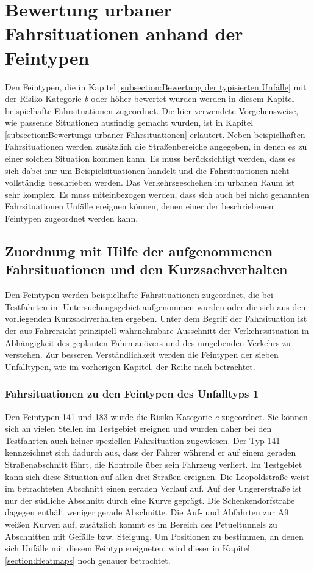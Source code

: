 \section{Bewertung urbaner Fahrsituationen anhand der Feintypen}\label{section:Zuordnung der Unfälle zu Fahrsituationen}
Den Feintypen, die in Kapitel \ref{subsection:Bewertung der typisierten Unfälle} mit der Risiko-Kategorie \textit{b} oder höher bewertet wurden werden in diesem Kapitel beispielhafte Fahrsituationen zugeordnet. Die hier verwendete Vorgehensweise, wie passende Situationen ausfindig gemacht wurden, ist in Kapitel \ref{subsection:Bewertungs urbaner Fahrsituationen} erläutert. Neben beispielhaften Fahrsituationen werden zusätzlich die Straßenbereiche angegeben, in denen es zu einer solchen Situation kommen kann. Es muss berücksichtigt werden, dass es sich dabei nur um Beispielsituationen handelt und die Fahrsituationen nicht vollständig beschrieben werden. Das Verkehrsgeschehen im urbanen Raum  ist sehr komplex. Es muss miteinbezogen werden, dass sich auch bei nicht genannten Fahrsituationen Unfälle ereignen können, denen einer der beschriebenen Feintypen zugeordnet werden kann.

\subsection{Zuordnung mit Hilfe der aufgenommenen Fahrsituationen und den Kurzsachverhalten}\label{subsection:Zuordnung mit den aufgenommenen Fahrsituationen}
Den Feintypen werden beispielhafte Fahrsituationen zugeordnet, die bei Testfahrten im Untersuchungsgebiet aufgenommen wurden oder die sich aus den vorliegenden Kurzsachverhalten ergeben. Unter dem Begriff der Fahrsituation ist der aus Fahrersicht prinzipiell wahrnehmbare Ausschnitt der Verkehrssituation in Abhängigkeit des geplanten Fahrmanövers und des umgebenden Verkehrs zu verstehen. Zur besseren Verständlichkeit werden die Feintypen der sieben Unfalltypen, wie im vorherigen Kapitel, der Reihe nach betrachtet.

\subsubsection{Fahrsituationen zu den Feintypen des Unfalltyps 1}
Den Feintypen 141 und 183 wurde die Risiko-Kategorie \textit{c} zugeordnet. Sie können sich an vielen Stellen im Testgebiet ereignen und wurden daher bei den Testfahrten auch keiner speziellen Fahrsituation zugewiesen. Der Typ 141 kennzeichnet sich dadurch aus, dass der Fahrer während er auf einem geraden Straßenabschnitt fährt, die Kontrolle über sein Fahrzeug verliert. Im Testgebiet kann sich diese Situation auf allen drei Straßen ereignen. Die Leopoldstraße weist im betrachteten Abschnitt einen geraden Verlauf auf. Auf der Ungererstraße ist nur der südliche Abschnitt durch eine Kurve geprägt. Die Schenkendorfstraße dagegen enthält weniger gerade Abschnitte. Die Auf- und Abfahrten zur A9 weißen Kurven auf, zusätzlich kommt es im Bereich des Petueltunnels zu Abschnitten mit Gefälle bzw. Steigung. Um Positionen zu bestimmen, an denen sich Unfälle mit diesem Feintyp ereigneten, wird dieser in Kapitel \ref{section:Heatmaps} noch genauer betrachtet.


